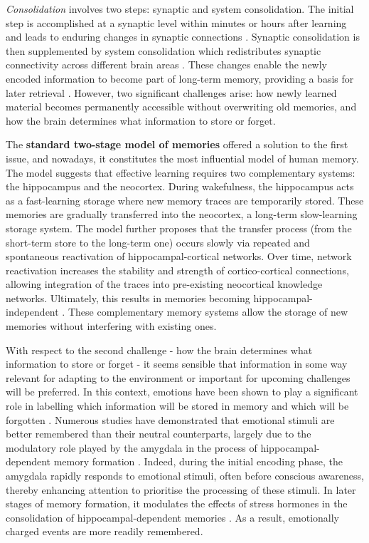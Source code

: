 \textit{Consolidation} involves two steps: synaptic and system consolidation. The initial step is accomplished at a synaptic level within minutes or hours after learning and leads to enduring changes in synaptic connections \parencite{kandel_molecular_2001}. Synaptic consolidation is then supplemented by system consolidation which redistributes synaptic connectivity across different brain areas \parencite{frankland_organization_2005}. These changes enable the newly encoded information to become part of long-term memory, providing a basis for later retrieval \parencite{rasch_about_2013}. However, two significant challenges arise: how newly learned material becomes permanently accessible without overwriting old memories, and how the brain determines what information to store or forget. 

The \textbf{standard two-stage model of memories} \parencite{marr_simple_1971} offered a solution to the first issue, and nowadays, it constitutes the most influential model of human memory. The model suggests that effective learning requires two complementary systems: the hippocampus and the neocortex. During wakefulness, the hippocampus acts as a fast-learning storage where new memory traces are temporarily stored. These memories are gradually transferred into the neocortex, a long-term slow-learning storage system. The model further proposes that the transfer process (from the short-term store to the long-term one) occurs slowly via repeated and spontaneous reactivation of hippocampal-cortical networks. Over time, network reactivation increases the stability and strength of cortico-cortical connections, allowing integration of the traces into pre-existing neocortical knowledge networks. Ultimately, this results in memories becoming hippocampal-independent \parencite{frankland_organization_2005,marr_simple_1971,squire_retrograde_1995}. These complementary memory systems allow the storage of new memories without interfering with existing ones.

With respect to the second challenge - how the brain determines what information to store or forget - it seems sensible that information in some way relevant for adapting to the environment or important for upcoming challenges will be preferred. In this context, emotions have been shown to play a significant role in labelling which information will be stored in memory and which will be forgotten \parencite{dolan_emotion_2002,williams_power_2022}. Numerous studies have demonstrated that emotional stimuli are better remembered than their neutral counterparts, largely due to the modulatory role played by the amygdala in the process of hippocampal-dependent memory formation \parencite{anderson_neural_2003,mcgaugh_memory_2000,mcgaugh_role_2002,vuilleumier_effects_2001,whalen_masked_1998}. Indeed, during the initial encoding phase, the amygdala rapidly responds to emotional stimuli, often before conscious awareness, thereby enhancing attention to prioritise the processing of these stimuli. In later stages of memory formation, it modulates the effects of stress hormones in the consolidation of hippocampal-dependent memories \parencite{diano_amygdala_2017,phelps_human_2004}. As a result, emotionally charged events are more readily remembered. 

